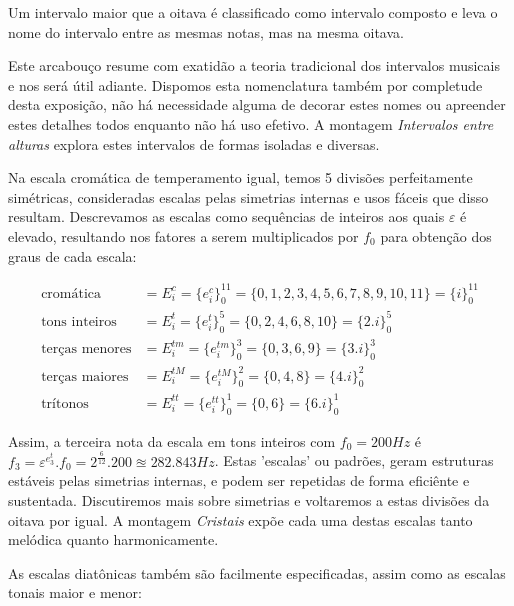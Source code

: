 Um intervalo maior que a oitava é classificado como intervalo composto e leva o nome do intervalo entre as mesmas notas, mas na mesma oitava.

Este arcabouço resume com exatidão a teoria tradicional dos intervalos musicais~\cite{Lacerda} e nos será útil adiante. Dispomos esta nomenclatura também por completude desta exposição, não há necessidade alguma de decorar estes nomes ou apreender estes detalhes todos enquanto não há uso efetivo. A montagem \emph{Intervalos entre alturas} explora estes intervalos de formas isoladas e diversas.


Na escala cromática
de temperamento igual, temos 5 divisões perfeitamente simétricas, consideradas
escalas pelas simetrias internas e usos fáceis que disso resultam. Descrevamos
as escalas como sequências de inteiros aos quais $\varepsilon$ é elevado, resultando
nos fatores a serem multiplicados por $f_0$ para obtenção dos graus de cada escala:

\begin{equation}\label{escSim}
\begin{split}
\text{cromática} & = E_i^c = \{e_i^c\}_0^{11} =  \{0,1,2,3,4,5,6,7,8,9,10,11\} = \{i\}_0^{11}\\
\text{tons inteiros} & = E_i^t = \{e_i^t\}_0^{5} = \{0,2,4,6,8,10\} = \{2.i\}_0^{5} \\
\text{terças menores} & = E_i^{tm} = \{e_i^{tm}\}_0^{3} = \{0,3,6,9\} = \{3.i\}_0^3 \\
\text{terças maiores} & = E_i^{tM} = \{e_i^{tM}\}_0^{2} = \{0,4,8\} = \{4.i\}_0^2\\
\text{trítonos} & = E_i^{tt} = \{e_i^{tt}\}_0^{1} = \{ 0, 6 \} = \{6.i\}_0^1
\end{split}
\end{equation}

Assim, a terceira nota da escala em tons inteiros com $f_0=200Hz$
é $f_3=\varepsilon^{e_3^t} . f_0 = 2^{\frac{6}{12}} . 200 \approxeq 282.843 Hz$. Estas
'escalas' ou padrões, geram estruturas estáveis pelas simetrias internas, e podem ser
repetidas de forma eficiênte e sustentada. Discutiremos mais sobre simetrias e voltaremos
a estas divisões da oitava por igual. A montagem \emph{Cristais} expõe cada uma destas escalas tanto melódica quanto harmonicamente.

As escalas diatônicas também são facilmente especificadas, assim como
as escalas tonais maior e menor:


